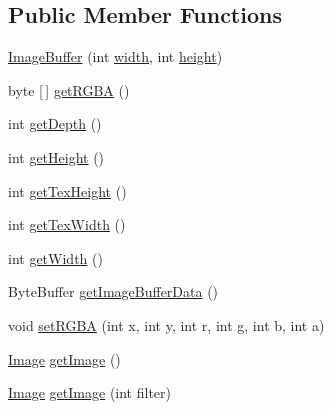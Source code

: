 \subsection*{Public Member Functions}
\begin{DoxyCompactItemize}
\item 
\mbox{\hyperlink{classorg_1_1newdawn_1_1slick_1_1_image_buffer_a1ab7545feb14aa4f36fab52bd898d3a2}{Image\+Buffer}} (int \mbox{\hyperlink{classorg_1_1newdawn_1_1slick_1_1_image_buffer_a3d1afc42dba7eb1ce006daeec78852f3}{width}}, int \mbox{\hyperlink{classorg_1_1newdawn_1_1slick_1_1_image_buffer_a3ddd231a45747a547db36fbd23ad426e}{height}})
\item 
byte \mbox{[}$\,$\mbox{]} \mbox{\hyperlink{classorg_1_1newdawn_1_1slick_1_1_image_buffer_a708c22250dc3f4d73eded038f57108f7}{get\+R\+G\+BA}} ()
\item 
int \mbox{\hyperlink{classorg_1_1newdawn_1_1slick_1_1_image_buffer_af74cb0da09fe9e93dc1ff79547c2b608}{get\+Depth}} ()
\item 
int \mbox{\hyperlink{classorg_1_1newdawn_1_1slick_1_1_image_buffer_a658cb27b181a326ee4de313b08190411}{get\+Height}} ()
\item 
int \mbox{\hyperlink{classorg_1_1newdawn_1_1slick_1_1_image_buffer_a2a4f40e965941b68ce3c47c57ab330a3}{get\+Tex\+Height}} ()
\item 
int \mbox{\hyperlink{classorg_1_1newdawn_1_1slick_1_1_image_buffer_a9691609c6c7e7776882af57cfd6daab9}{get\+Tex\+Width}} ()
\item 
int \mbox{\hyperlink{classorg_1_1newdawn_1_1slick_1_1_image_buffer_a802e5461f8a85e80513ccb93da536082}{get\+Width}} ()
\item 
Byte\+Buffer \mbox{\hyperlink{classorg_1_1newdawn_1_1slick_1_1_image_buffer_a70b5c0d88ff0fff39cb5bf73a18e402d}{get\+Image\+Buffer\+Data}} ()
\item 
void \mbox{\hyperlink{classorg_1_1newdawn_1_1slick_1_1_image_buffer_a99159381a5c45bc279cac0a77f7cb2dc}{set\+R\+G\+BA}} (int x, int y, int r, int g, int b, int a)
\item 
\mbox{\hyperlink{classorg_1_1newdawn_1_1slick_1_1_image}{Image}} \mbox{\hyperlink{classorg_1_1newdawn_1_1slick_1_1_image_buffer_a37a44b89c9d01300631b4368074b08d8}{get\+Image}} ()
\item 
\mbox{\hyperlink{classorg_1_1newdawn_1_1slick_1_1_image}{Image}} \mbox{\hyperlink{classorg_1_1newdawn_1_1slick_1_1_image_buffer_a8d6a39b67e7629abb8882c1bfbccf3d3}{get\+Image}} (int filter)
\end{DoxyCompactItemize}

